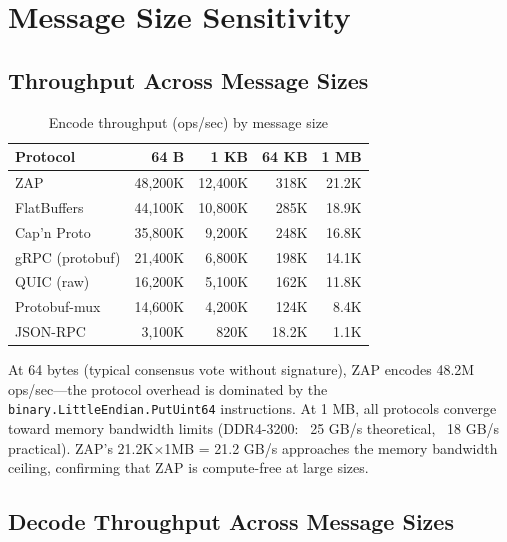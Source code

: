 \section{Message Size Sensitivity}


\subsection{Throughput Across Message Sizes}

\begin{table}[h]
\centering
\caption{Encode throughput (ops/sec) by message size}
\label{tab:sizes}
\begin{tabular}{lrrrr}
\toprule
\textbf{Protocol} & \textbf{64 B} & \textbf{1 KB} & \textbf{64 KB} & \textbf{1 MB} \\
\midrule
\rowcolor{luxblue!10}
ZAP & 48,200K & 12,400K & 318K & 21.2K \\
FlatBuffers & 44,100K & 10,800K & 285K & 18.9K \\
Cap'n Proto & 35,800K & 9,200K & 248K & 16.8K \\
gRPC (protobuf) & 21,400K & 6,800K & 198K & 14.1K \\
QUIC (raw) & 16,200K & 5,100K & 162K & 11.8K \\
Protobuf-mux & 14,600K & 4,200K & 124K & 8.4K \\
JSON-RPC & 3,100K & 820K & 18.2K & 1.1K \\
\bottomrule
\end{tabular}
\end{table}

At 64 bytes (typical consensus vote without signature), ZAP encodes 48.2M ops/sec---the protocol overhead is dominated by the \texttt{binary.LittleEndian.PutUint64} instructions. At 1 MB, all protocols converge toward memory bandwidth limits (DDR4-3200: ~25 GB/s theoretical, ~18 GB/s practical). ZAP's 21.2K$\times$1MB = 21.2 GB/s approaches the memory bandwidth ceiling, confirming that ZAP is compute-free at large sizes.

\subsection{Decode Throughput Across Message Sizes}

